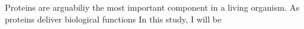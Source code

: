 Proteins are arguabiliy the most important component in a living organism. As  proteins deliver biological functions   In this study, I will be 